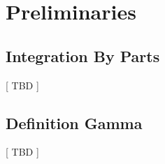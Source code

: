 \newpage
\section{Preliminaries}


\subsection{Integration By Parts}
[ TBD ]


\subsection{Definition Gamma}
[ TBD ]
